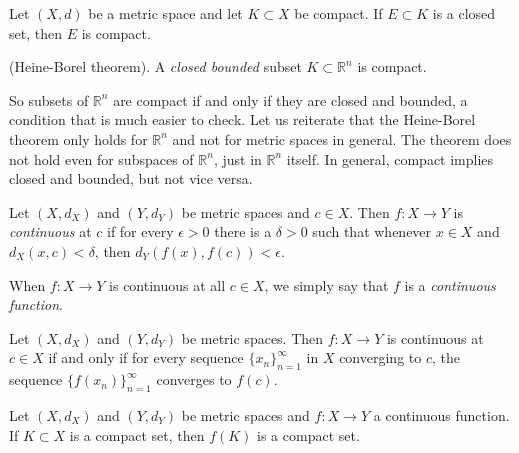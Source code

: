 \documentclass[../main.tex]{subfiles}
\begin{document}
            \begin{proposition} \label{prop:compact_closed_subset}
            Let \( (X, d) \) be a metric space and let \( K \subset X \) be compact. If \( E \subset K \) is a closed set, then \( E \) is compact.
            \end{proposition}
            
            \begin{theorem} \label{thm:heine_borel}
            (Heine-Borel theorem). A \textit{closed bounded} subset \( K \subset \mathbb{R}^n \) is compact.
            
            So subsets of \( \mathbb{R}^n \) are compact if and only if they are closed and bounded, a condition that is much easier to check. Let us reiterate that the Heine-Borel theorem only holds for \( \mathbb{R}^n \) and not for metric spaces in general. The theorem does not hold even for subspaces of \( \mathbb{R}^n \), just in \( \mathbb{R}^n \) itself. In general, compact implies closed and bounded, but not vice versa.
            \end{theorem}
            
            \begin{definition} \label{def:continuous_function}
            Let \( (X, d_X) \) and \( (Y, d_Y) \) be metric spaces and \( c \in X \). Then \( f: X \to Y \) is \textit{continuous} at \( c \) if for every \( \epsilon > 0 \) there is a \( \delta > 0 \) such that whenever \( x \in X \) and \( d_X(x, c) < \delta \), then \( d_Y(f(x), f(c)) < \epsilon \).
            
            When \( f: X \to Y \) is continuous at all \( c \in X \), we simply say that \( f \) is a \textit{continuous function}.
            \end{definition}
            
            \begin{proposition} \label{prop:continuity_sequence}
            Let \( (X, d_X) \) and \( (Y, d_Y) \) be metric spaces. Then \( f: X \to Y \) is continuous at \( c \in X \) if and only if for every sequence \( \{x_n\}_{n=1}^{\infty} \) in \( X \) converging to \( c \), the sequence \( \{f(x_n)\}_{n=1}^{\infty} \) converges to \( f(c) \).
            \end{proposition}
            
            \begin{lemma} \label{lem:continuous_compact}
            Let \( (X, d_X) \) and \( (Y, d_Y) \) be metric spaces and \( f: X \to Y \) a continuous function. If \( K \subset X \) is a compact set, then \( f(K) \) is a compact set.
            \end{lemma}
\end{document}
